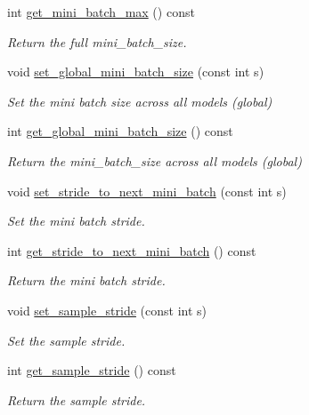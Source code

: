 \begin{DoxyCompactItemize}
int \hyperlink{classlbann_1_1generic__data__reader_a92574413c82813cc50fbdfbb70b4065d}{get\+\_\+mini\+\_\+batch\+\_\+max} () const
\begin{DoxyCompactList}\small\item\em Return the full mini\+\_\+batch\+\_\+size. \end{DoxyCompactList}\item 
void \hyperlink{classlbann_1_1generic__data__reader_a03388338e75d37e1b28389d22bd5b604}{set\+\_\+global\+\_\+mini\+\_\+batch\+\_\+size} (const int s)
\begin{DoxyCompactList}\small\item\em Set the mini batch size across all models (global) \end{DoxyCompactList}\item 
int \hyperlink{classlbann_1_1generic__data__reader_aaa4110d53f59a127326e63ca4110b56b}{get\+\_\+global\+\_\+mini\+\_\+batch\+\_\+size} () const
\begin{DoxyCompactList}\small\item\em Return the mini\+\_\+batch\+\_\+size across all models (global) \end{DoxyCompactList}\item 
void \hyperlink{classlbann_1_1generic__data__reader_add5bd1d488967ebab5852b636e07db15}{set\+\_\+stride\+\_\+to\+\_\+next\+\_\+mini\+\_\+batch} (const int s)
\begin{DoxyCompactList}\small\item\em Set the mini batch stride. \end{DoxyCompactList}\item 
int \hyperlink{classlbann_1_1generic__data__reader_a2d1d5657e8b9bf8b8a9d51b33aedf017}{get\+\_\+stride\+\_\+to\+\_\+next\+\_\+mini\+\_\+batch} () const
\begin{DoxyCompactList}\small\item\em Return the mini batch stride. \end{DoxyCompactList}\item 
void \hyperlink{classlbann_1_1generic__data__reader_adb90391e3e9c8e3c2aba4d4a0911ca82}{set\+\_\+sample\+\_\+stride} (const int s)
\begin{DoxyCompactList}\small\item\em Set the sample stride. \end{DoxyCompactList}\item 
int \hyperlink{classlbann_1_1generic__data__reader_a48990d714a247463b135784f235f8a50}{get\+\_\+sample\+\_\+stride} () const
\begin{DoxyCompactList}\small\item\em Return the sample stride. \end{DoxyCompactList}\item 

\end{DoxyCompactItemize}
